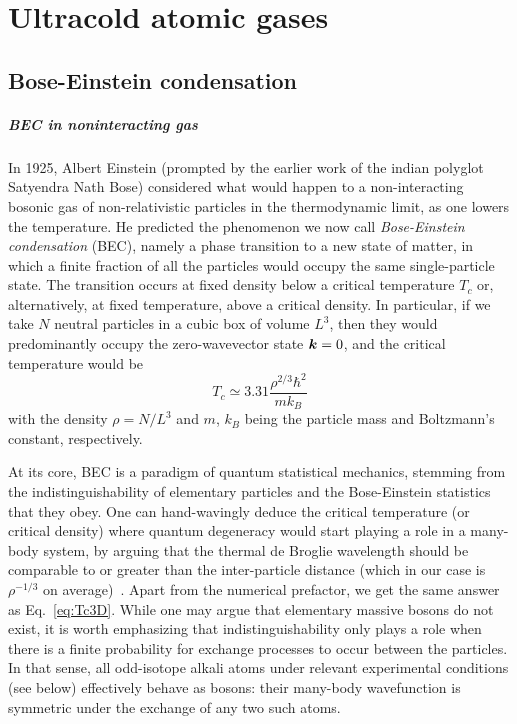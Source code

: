 \chapter{Ultracold atomic gases}
\label{cha:cold-gases}

\section{Bose-Einstein condensation}
\label{sec:BEC}


\paragraph{BEC in noninteracting gas}
In 1925, Albert Einstein (prompted by the earlier work of the indian
polyglot Satyendra Nath Bose) considered what would happen to a
non-interacting bosonic gas of non-relativistic particles in the
thermodynamic limit, as one lowers the temperature. He predicted the
phenomenon we now call \textit{Bose-Einstein condensation} (BEC),
namely a phase transition to a new state of matter, in which a finite
fraction of all the particles would occupy the same single-particle
state. The transition occurs at fixed density below a critical
temperature $T_c$ or, alternatively, at fixed temperature, above a
critical density. In particular, if we take $N$ neutral particles in a
cubic box of volume $L^3$, then they would predominantly occupy the
zero-wavevector state $\bm{k} = 0$, and the critical temperature would
be~\cite{9780198507192}
%
\begin{equation}\label{eq:Tc3D}
  T_c \simeq 3.31 \frac{\rho^{2/3}\hbar^2}{m k_B}
\end{equation}
%
with the density $\rho = N/L^3$ and $m$, $k_B$ being the particle
mass and Boltzmann's constant, respectively.

At its core, BEC is a paradigm of quantum statistical mechanics,
stemming from the indistinguishability of elementary particles and the
Bose-Einstein statistics that they obey. One can hand-wavingly deduce
the critical temperature (or critical density) where quantum
degeneracy would start playing a role in a many-body system, by
arguing that the thermal de Broglie wavelength should be comparable to
or greater than the inter-particle distance (which in our case is
$\rho^{-1/3}$ on average)~\cite{Leggett_1999}. Apart from the
numerical prefactor, we get the same answer as
Eq.~\eqref{eq:Tc3D}. While one may argue that elementary massive
bosons do not exist, it is worth emphasizing that indistinguishability
only plays a role when there is a finite probability for exchange
processes to occur between the particles. In that sense, all
odd-isotope alkali atoms under relevant experimental conditions (see
below) effectively behave as bosons: their many-body wavefunction is
symmetric under the exchange of any two such atoms.

